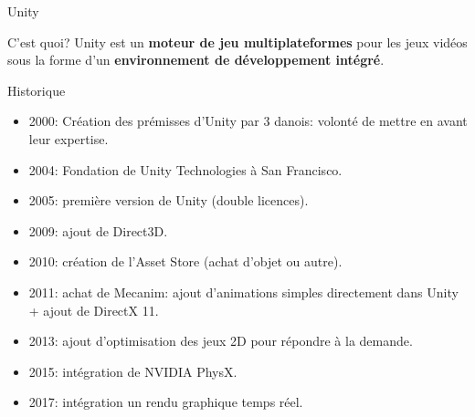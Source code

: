 \begin{frame}{Unity}
\begin{block}{C'est quoi?}
	Unity est un \textbf{moteur de jeu multiplateformes} pour les jeux vidéos sous la forme d'un \textbf{environnement de développement intégré}. 
	
\end{block}

\begin{block}{Historique}
\begin{itemize}
	\item 2000: Création des prémisses d'Unity par 3 danois: volonté de mettre en avant leur expertise.
	\item 2004: Fondation de Unity Technologies à San Francisco.
	\item 2005: première version de Unity (double licences).
	\item 2009: ajout de Direct3D.
	\item 2010: création de l'Asset Store (achat d'objet ou autre).
	\item 2011: achat de Mecanim: ajout d'animations simples directement dans Unity + ajout de DirectX 11.
	\item 2013: ajout d'optimisation des jeux 2D pour répondre à la demande.
	\item 2015: intégration de NVIDIA PhysX.
	\item 2017: intégration un rendu graphique temps réel.
\end{itemize}
\end{block}

\end{frame}

